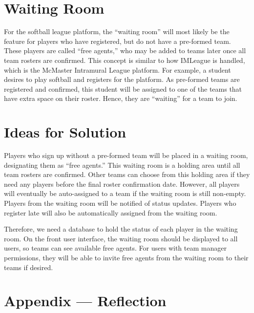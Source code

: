 \documentclass[12pt]{article}
\begin{document}
\section{Waiting Room}
For the softball league platform, the “waiting room” will most likely be the feature for players who have registered, but do not have a pre-formed team. These players are called “free agents,” who may be added to teams later once all team rosters are confirmed. This concept is similar to how IMLeague is handled, which is the McMaster Intramural League platform. For example, a student desires to play softball and registers for the platform. As pre-formed teams are registered and confirmed, this student will be assigned to one of the teams that have extra space on their roster. Hence, they are “waiting” for a team to join.

\section{Ideas for Solution}
Players who sign up without a pre-formed team will be placed in a waiting room, designating them as “free agents.” This waiting room is a holding area until all team rosters are confirmed. Other teams can choose from this holding area if they need any players before the final roster confirmation date. However, all players will eventually be auto-assigned to a team if the waiting room is still non-empty. Players from the waiting room will be notified of status updates. Players who register late will also be automatically assigned from the waiting room.

Therefore, we need a database to hold the status of each player in the waiting room. On the front user interface, the waiting room should be displayed to all users, so teams can see available free agents. For users with team manager permissions, they will be able to invite free agents from the waiting room to their teams if desired.


\newpage{}
\section*{Appendix --- Reflection}




\end{document}
